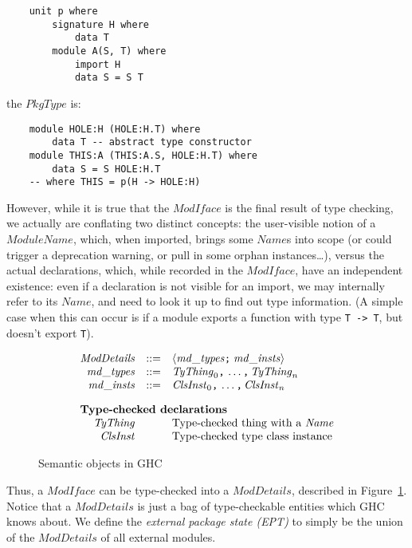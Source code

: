 \documentclass{article}
\newcommand{\I}[1]{\ensuremath{\mathit{#1}}}
\begin{document}
\begin{verbatim}
    unit p where
        signature H where
            data T
        module A(S, T) where
            import H
            data S = S T
\end{verbatim}
%
the \I{PkgType} is:

\begin{verbatim}
    module HOLE:H (HOLE:H.T) where
        data T -- abstract type constructor
    module THIS:A (THIS:A.S, HOLE:H.T) where
        data S = S HOLE:H.T
    -- where THIS = p(H -> HOLE:H)
\end{verbatim}
%
However, while it is true that the \I{ModIface} is the final result
of type checking, we actually are conflating two distinct concepts: the user-visible
notion of a \I{ModuleName}, which, when imported, brings some \I{Name}s
into scope (or could trigger a deprecation warning, or pull in some
orphan instances\ldots), versus the actual declarations, which, while recorded
in the \I{ModIface}, have an independent existence: even if a declaration
is not visible for an import, we may internally refer to its \I{Name}, and
need to look it up to find out type information.  (A simple case when
this can occur is if a module exports a function with type \verb|T -> T|,
but doesn't export \verb|T|).

\begin{figure}[htpb]
$$
\begin{array}{rcll}
\I{ModDetails} & ::= & \langle\I{md\_types} \verb|;|\; \I{md\_insts}\rangle \\
\I{md\_types}  & ::= & \I{TyThing}_0 \verb|,|\, \ldots\verb|,|\, \I{TyThing}_n \\
\I{md\_insts}  & ::= & \I{ClsInst}_0 \verb|,|\, \ldots\verb|,|\, \I{ClsInst}_n \\[1em]
\multicolumn{3}{l}{\mbox{\bf Type-checked declarations}} \\
\I{TyThing}    &     & \mbox{Type-checked thing with a \I{Name}} \\
\I{ClsInst}    &     & \mbox{Type-checked type class instance} \\
\end{array}
$$
\caption{Semantic objects in GHC} \label{fig:typecheck-more}
\end{figure}

Thus, a \I{ModIface} can be type-checked into a \I{ModDetails}, described in
Figure~\ref{fig:typecheck-more}.  Notice that a \I{ModDetails} is just
a bag of type-checkable entities which GHC knows about.  We
define the \emph{external package state (EPT)} to
simply be the union of the \I{ModDetails}
of all external modules.
\end{document}
